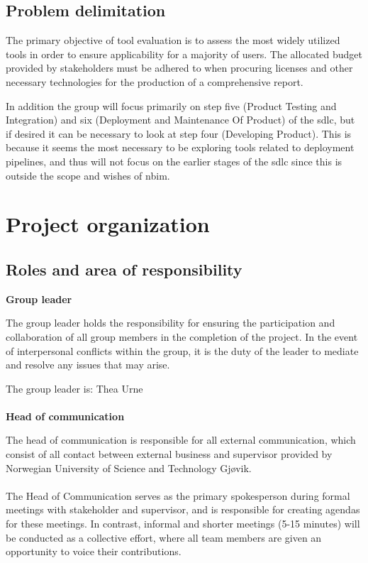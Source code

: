 \subsection{Problem delimitation}

The primary objective of tool evaluation is to assess the most widely utilized tools in order to ensure applicability for a majority of users. The allocated budget provided by stakeholders must be adhered to when procuring licenses and other necessary technologies for the production of a comprehensive report.

In addition the group will focus primarily on step five (Product Testing and Integration) and six (Deployment and Maintenance Of Product) of the \acrshort{sdlc}, but if desired it can be necessary to look at step four (Developing Product). This is because it seems the most necessary to be exploring tools related to deployment pipelines, and thus will not focus on the earlier stages of the \acrshort{sdlc} since this is outside the scope and wishes of \acrshort{nbim}.
\cite{The-Secure-Software-Supply-Chain} \cite{sdlc}

\newpage
\section{Project organization}
\subsection{Roles and area of responsibility}

\textbf{Group leader}

The group leader holds the responsibility for ensuring the participation and collaboration of all group members in the completion of the project. In the event of interpersonal conflicts within the group, it is the duty of the leader to mediate and resolve any issues that may arise.

The group leader is: Thea Urne
\\~\\
\textbf{Head of communication}

The head of communication is responsible for all external communication, which consist of all contact between external business and supervisor provided by Norwegian University of Science and Technology Gjøvik. 
\\~\\
The Head of Communication serves as the primary spokesperson during formal meetings with stakeholder and supervisor, and is responsible for creating agendas for these meetings. In contrast, informal and shorter meetings (5-15 minutes) will be conducted as a collective effort, where all team members are given an opportunity to voice their contributions.

